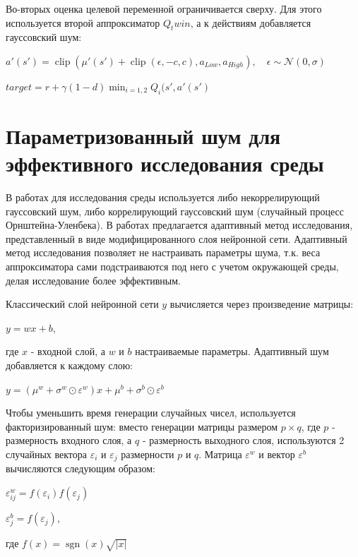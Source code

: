 \documentclass{mipt-thesis-bs}
\begin{document}
Во-вторых оценка целевой переменной ограничивается сверху. Для этого используется второй аппроксиматор $Q_twin$, а к действиям добавляется гауссовский шум:

\begin{center}
    $a'(s')=\operatorname{clip}(\mu'(s')+\operatorname{clip}(\epsilon,-c, c), a_{L o w}, a_{H i g h}), \quad \epsilon \sim \mathcal{N}(0, \sigma)$
    
    $target=r+\gamma(1-d) \min _{i=1,2} Q_i(s', a'(s')$
\end{center}

\section{Параметризованный шум для эффективного исследования среды}

В работах \cite{ddpg, td3} для исследования среды используется либо некоррелирующий гауссовский шум, либо коррелирующий гауссовский шум (случайный процесс Орнштейна-Уленбека). В работах \cite{noisy layers, adaptive noise} предлагается адаптивный метод исследования, представленный в виде модифицированного слоя нейронной сети. Адаптивный метод исследования позволяет не настраивать параметры шума, т.к. веса аппроксиматора сами подстраиваются под него с учетом окружающей среды, делая исследование более эффективным. 

Классический слой нейронной сети $y$ вычисляется через произведение матрицы:

\begin{center}
    $y=w x+b$,
\end{center}

где $x$ - входной слой, а $w$ и $b$ настраиваемые параметры. Адаптивный шум добавляется к каждому слою:

\begin{center}
    $y =(\mu^{w}+\sigma^{w} \odot \varepsilon^{w}) x+\mu^{b}+\sigma^{b} \odot \varepsilon^{b}$
\end{center}

Чтобы уменьшить время генерации случайных чисел, используется факторизированный шум: вместо генерации матрицы размером $p\times q$, где $p$ - размерность входного слоя, а $q$ - размерность выходного слоя, используются 2 случайных вектора $\varepsilon_i$ и $\varepsilon_j$ размерности $p$ и $q$. Матрица $\varepsilon^w$ и вектор $\varepsilon^b$ вычисляются следующим образом:

\begin{center}
$\varepsilon_{i j}^{w} =f(\varepsilon_{i}) f(\varepsilon_{j})$

$\varepsilon_{j}^{b} =f(\varepsilon_{j})$,

где $f(x)=\operatorname{sgn}(x) \sqrt{|x|}$
\end{center}
\end{document}
